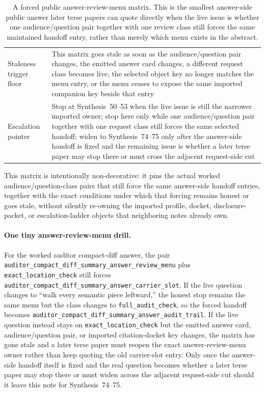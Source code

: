 \documentclass[11pt]{article}
\begin{document}
\begin{table}[t]
\begin{tabularx}{\linewidth}{@{}lX@{}}
Staleness trigger floor & This matrix goes stale as soon as the audience/question pair changes, the emitted answer card changes, a different request class becomes live, the selected object key no longer matches the menu entry, or the menu ceases to expose the same imported companion key beside that entry \\
Escalation pointer & Stop at Synthesis~50--53 when the live issue is still the narrower imported owner; stop here only while one audience/question pair together with one request class still forces the same selected handoff; widen to Synthesis~74--75 only after the answer-side handoff is fixed and the remaining issue is whether a later terse paper may stop there or must cross the adjacent request-side cut \\
\bottomrule
\end{tabularx}
\caption{A forced public answer-review-menu matrix. This is the smallest answer-side public answer later terse papers can quote directly when the live issue is whether one audience/question pair together with one review class still forces the same maintained handoff entry, rather than merely which menu exists in the abstract.}
\label{tab:forced-public-answer-review-menu-matrix}
\end{table}

This matrix is intentionally non-decorative: it pins the actual worked audience/question-class pairs that still force the same answer-side handoff entries, together with the exact conditions under which that forcing remains honest or goes stale, without silently re-owning the imported profile, docket, disclosure-packet, or escalation-ladder objects that neighboring notes already own.\cite{series:workedexample}

\paragraph{One tiny answer-review-menu drill.}
For the worked auditor compact-diff answer, the pair \nolinkurl{auditor_compact_diff_summary_answer_review_menu} plus \nolinkurl{exact_location_check} still forces \nolinkurl{auditor_compact_diff_summary_answer_carrier_slot}. If the live question changes to ``walk every semantic piece leftward,'' the honest stop remains the same menu but the class changes to \nolinkurl{full_audit_check}, so the forced handoff becomes \nolinkurl{auditor_compact_diff_summary_answer_audit_trail}. If the live question instead stays on \nolinkurl{exact_location_check} but the emitted answer card, audience/question pair, or imported citation-docket key changes, the matrix has gone stale and a later terse paper must reopen the exact answer-review-menu owner rather than keep quoting the old carrier-slot entry. Only once the answer-side handoff itself is fixed and the real question becomes whether a later terse paper may stop there or must widen across the adjacent request-side cut should it leave this note for Synthesis~74--75.\cite{series:workedexample}
\end{document}
